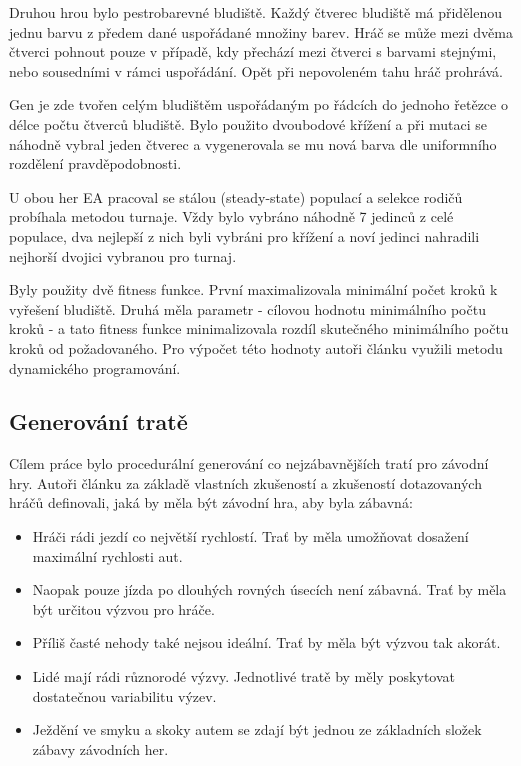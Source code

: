 Druhou hrou bylo pestrobarevné bludiště. Každý čtverec bludiště má přidělenou jednu barvu z předem dané uspořádané množiny barev. Hráč se může mezi dvěma čtverci pohnout pouze v případě, kdy přechází mezi čtverci s barvami stejnými, nebo sousedními v rámci uspořádání. Opět při nepovoleném tahu hráč prohrává.

Gen je zde tvořen celým bludištěm uspořádaným po řádcích do jednoho řetězce o délce počtu čtverců bludiště. Bylo použito dvoubodové křížení a při mutaci se náhodně vybral jeden čtverec a vygenerovala se mu nová barva dle uniformního rozdělení pravděpodobnosti.

U obou her EA pracoval se stálou (steady-state) populací a selekce rodičů probíhala metodou turnaje. Vždy bylo vybráno náhodně 7 jedinců z celé populace, dva nejlepší z nich byli vybráni pro křížení a noví jedinci nahradili nejhorší dvojici vybranou pro turnaj.

Byly použity dvě fitness funkce. První maximalizovala minimální počet kroků k vyřešení bludiště. Druhá měla parametr - cílovou hodnotu minimálního počtu kroků - a tato fitness funkce minimalizovala rozdíl skutečného minimálního počtu kroků od požadovaného. Pro výpočet této hodnoty autoři článku využili metodu dynamického programování.

\subsection{Generování tratě}

Cílem práce \cite{EvolTrack} bylo procedurální generování co nejzábavnějších tratí pro závodní hry. Autoři článku za základě vlastních zkušeností a zkušeností dotazovaných hráčů definovali, jaká by měla být závodní hra, aby byla zábavná:


\begin{itemize}
	\item Hráči rádi jezdí co největší rychlostí. Trať by měla umožňovat dosažení maximální rychlosti aut.
	\item Naopak pouze jízda po dlouhých rovných úsecích není zábavná. Trať by měla být určitou výzvou pro hráče.
	\item Příliš časté nehody také nejsou ideální. Trať by měla být výzvou tak akorát.
	\item Lidé mají rádi různorodé výzvy. Jednotlivé tratě by měly poskytovat dostatečnou variabilitu výzev.
	\item Ježdění ve smyku a skoky autem se zdají být jednou ze základních složek zábavy závodních her.
\end{itemize}

